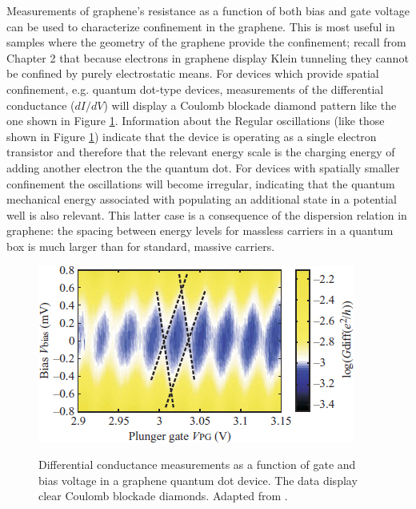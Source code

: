 \documentclass[edeposit,fullpage,draftthesis]{uiucthesis2009}
\begin{document}
            Measurements of graphene's resistance as a function of both bias and gate voltage can be used to
            characterize confinement in the graphene. This is most useful in samples where the geometry
            of the graphene provide the confinement; recall from Chapter 2 that because electrons in graphene
            display Klein tunneling they cannot be confined by purely electrostatic means.
            For devices which provide spatial confinement, e.g. quantum dot-type devices, measurements
            of the differential conductance ($dI/dV$) will display a Coulomb blockade diamond pattern
            like the one shown in Figure \ref{fig:cb_diamond}. Information about the 
            Regular oscillations (like those shown in Figure \ref{fig:cb_diamond}) indicate that the device
            is operating as a single electron transistor
            and therefore that the relevant energy scale is the charging energy of adding another electron the the quantum dot.
            For devices with spatially smaller confinement the oscillations will become irregular, indicating 
            that the quantum mechanical energy associated with populating an additional state in a potential well
            is also relevant. This latter case is a consequence of the dispersion relation in graphene: the spacing
            between energy levels for massless carriers in a quantum box is much larger than for standard, massive carriers.
            
            \begin{figure}
                \centering
                \includegraphics[width=0.5\linewidth]{images/experimentaltechniques/cb_diamond.jpg}\\
                \caption[Coulomb blockade diamonds in graphene]{
                    Differential conductance measurements as a function of gate and bias voltage in a 
                    graphene quantum dot device. The data display clear Coulomb blockade diamonds.
                    Adapted from \cite{guttinger2008coulomb}.
                    }
                \label{fig:cb_diamond}
            \end{figure}
            
\end{document}
